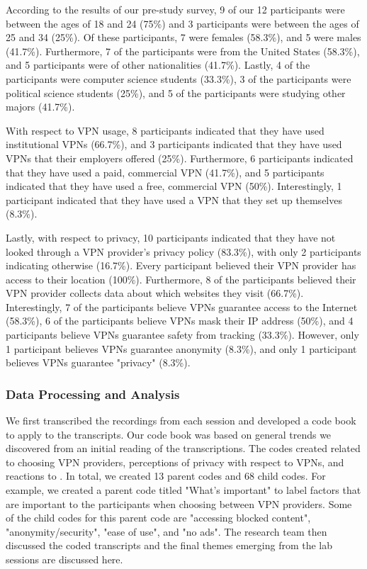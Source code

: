 According to the results of our pre-study survey, 9 of our 12 participants were between the ages of 18 and 24 (75\%) and 3 participants were between the ages of 25 and 34 (25\%).
Of these participants, 7 were females (58.3\%), and 5 were males (41.7\%).
Furthermore, 7 of the participants were from the United States (58.3\%), and 5 participants were of other nationalities (41.7\%). 
Lastly, 4 of the participants were computer science students (33.3\%), 3 of the participants were political science students (25\%), and 5 of the participants were studying other majors (41.7\%).

With respect to VPN usage, 8 participants indicated that they have used institutional VPNs (66.7\%), and 3 participants indicated that they have used VPNs that their employers offered (25\%).
Furthermore, 6 participants indicated that they have used a paid, commercial VPN (41.7\%), and 5 participants indicated that they have used a free, commercial VPN (50\%).
Interestingly, 1 participant indicated that they have used a VPN that they set up themselves (8.3\%).

Lastly, with respect to privacy, 10 participants indicated that they have not looked through a VPN provider's privacy policy (83.3\%), with only 2 participants indicating otherwise (16.7\%).
Every participant believed their VPN provider has access to their location (100\%).
Furthermore, 8 of the participants believed their VPN provider collects data about which websites they visit (66.7\%).
Interestingly, 7 of the participants believe VPNs guarantee access to the Internet (58.3\%), 6 of the participants believe VPNs mask their IP address (50\%), and 4 participants believe VPNs guarantee safety from tracking (33.3\%).
However, only 1 participant believes VPNs guarantee anonymity (8.3\%), and only 1 participant believes VPNs guarantee "privacy" (8.3\%).

\subsubsection{Data Processing and Analysis}
We first transcribed the recordings from each session and developed a code book to apply to the transcripts.
Our code book was based on general trends we discovered from an initial reading of the transcriptions.
The codes created related to choosing VPN providers, perceptions of privacy with respect to VPNs, and reactions to \tool.
In total, we created 13 parent codes and 68 child codes. For example, we created a parent code titled "What's important" to label factors that are important to the participants when choosing between VPN providers. Some of the child codes for this parent code are "accessing blocked content", "anonymity/security", "ease of use", and "no ads". The research team then discussed the coded transcripts and the final themes emerging from the lab sessions are discussed here.

